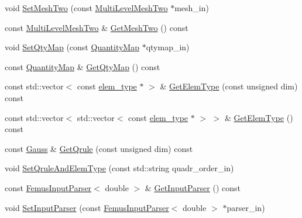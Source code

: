 \begin{DoxyCompactItemize}
\item 
void \mbox{\hyperlink{classfemus_1_1_multi_level_problem_a4dff5097f68e7cca5c936206eb54b70c}{Set\+Mesh\+Two}} (const \mbox{\hyperlink{classfemus_1_1_multi_level_mesh_two}{Multi\+Level\+Mesh\+Two}} $\ast$mesh\+\_\+in)
\item 
const \mbox{\hyperlink{classfemus_1_1_multi_level_mesh_two}{Multi\+Level\+Mesh\+Two}} \& \mbox{\hyperlink{classfemus_1_1_multi_level_problem_a808130e894a8e5d0e36f0ff3a9cf7b1c}{Get\+Mesh\+Two}} () const
\item 
void \mbox{\hyperlink{classfemus_1_1_multi_level_problem_a9f936cd6d8b12a03db8bc9c60b2dfde5}{Set\+Qty\+Map}} (const \mbox{\hyperlink{classfemus_1_1_quantity_map}{Quantity\+Map}} $\ast$qtymap\+\_\+in)
\item 
const \mbox{\hyperlink{classfemus_1_1_quantity_map}{Quantity\+Map}} \& \mbox{\hyperlink{classfemus_1_1_multi_level_problem_aa23a970132432fac21483891443c3fb5}{Get\+Qty\+Map}} () const
\item 
const std\+::vector$<$ const \mbox{\hyperlink{classfemus_1_1elem__type}{elem\+\_\+type}} $\ast$ $>$ \& \mbox{\hyperlink{classfemus_1_1_multi_level_problem_ac257887f78cc95c8fd1ea1e720cb57f2}{Get\+Elem\+Type}} (const unsigned dim) const
\item 
const std\+::vector$<$ std\+::vector$<$ const \mbox{\hyperlink{classfemus_1_1elem__type}{elem\+\_\+type}} $\ast$ $>$ $>$ \& \mbox{\hyperlink{classfemus_1_1_multi_level_problem_a71d1a701f785027bd03142ab78e5990c}{Get\+Elem\+Type}} () const
\item 
const \mbox{\hyperlink{classfemus_1_1_gauss}{Gauss}} \& \mbox{\hyperlink{classfemus_1_1_multi_level_problem_a1dfd69a30b627a2c75061cf0dd6bacba}{Get\+Qrule}} (const unsigned dim) const
\item 
void \mbox{\hyperlink{classfemus_1_1_multi_level_problem_aa541cabeb82cf89514fc5ec3a6e7a9ae}{Set\+Qrule\+And\+Elem\+Type}} (const std\+::string quadr\+\_\+order\+\_\+in)
\item 
const \mbox{\hyperlink{classfemus_1_1_femus_input_parser}{Femus\+Input\+Parser}}$<$ double $>$ \& \mbox{\hyperlink{classfemus_1_1_multi_level_problem_adaaddcb5e2f5c4e7370604c396039416}{Get\+Input\+Parser}} () const
\item 
void \mbox{\hyperlink{classfemus_1_1_multi_level_problem_a2c17b07afaaddf44d1c02c651b144b7f}{Set\+Input\+Parser}} (const \mbox{\hyperlink{classfemus_1_1_femus_input_parser}{Femus\+Input\+Parser}}$<$ double $>$ $\ast$parser\+\_\+in)
\end{DoxyCompactItemize}
